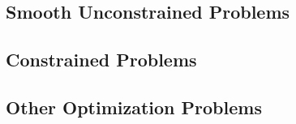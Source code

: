 \subsection{Smooth Unconstrained Problems}


\subsection{Constrained Problems}


\subsection{Other Optimization Problems}

